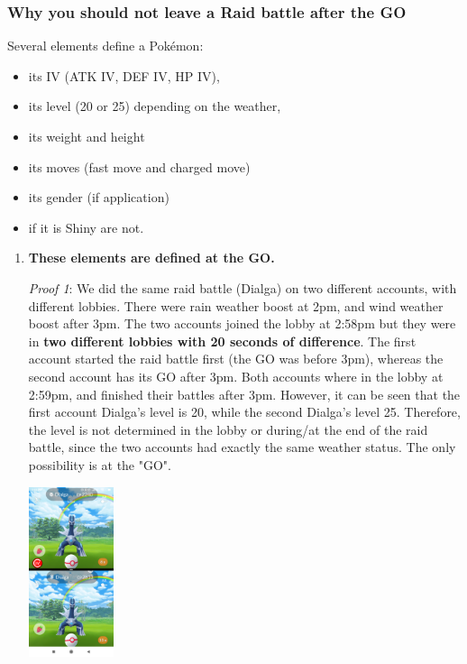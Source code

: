 \documentclass[12pt]{beamer}
\begin{document}
\begin{frame}
\frametitle{Why you should not leave a Raid battle after the GO}

\begin{block}{}
\begin{footnotesize}
Several elements define a Pokémon:
\begin{itemize}
\item its IV (ATK IV, DEF IV, HP IV),
\item its level (20 or 25) depending on the weather,
\item its weight and height
\item its moves (fast move and charged move)
\item its gender (if application)
\item if it is Shiny are not.
\end{itemize}

\bigskip

\begin{enumerate}
  \item \textbf{These elements are defined at the GO. } 


\parbox{0.75\linewidth}{
\emph{Proof 1}: We did the same raid battle (Dialga) on two different accounts, with different lobbies. There were rain weather boost at 2pm, and wind weather boost after 3pm. The two accounts joined the lobby at 2:58pm but they were in \textbf{two different lobbies with 20 seconds of difference}. The first account started the raid battle first (the GO was before 3pm), whereas the second account has its GO after 3pm. Both accounts where in the lobby at 2:59pm, and finished their battles after 3pm. However, it can be seen that the first account Dialga's level is 20, while the second Dialga's level 25. Therefore, the level is not determined in the lobby or during/at the end of the raid battle, since the two accounts had exactly the same weather status. The only possibility is at the "GO".
}
\parbox{0.02\linewidth}{\quad}
\parbox{0.2\linewidth}{
\begin{center}
\includegraphics[width=2.5cm]{54435651_723596804707123_4963745028846387200_n.png}
\end{center}
}


\end{enumerate}
\end{footnotesize}
\end{block}
\end{frame}
\end{document}
